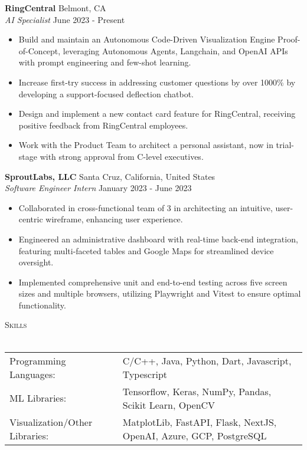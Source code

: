 \documentclass[a4paper]{article}
\newcommand{\lineunder} {
    \vspace*{-8pt} \\
    \hspace*{-18pt} \hrulefill \\
}
\newcommand{\header} [1] {
    {\hspace*{-18pt}\vspace*{6pt} \textsc{#1}}
    \vspace*{-6pt} \lineunder
}
\begin{document}
      \textbf{RingCentral} \hfill Belmont, CA\\
          \textit{AI Specialist} \hfill June 2023 - Present\\
          \vspace{-1mm}
\begin{itemize} \itemsep 1pt
  \item Build and maintain an Autonomous Code-Driven Visualization Engine Proof-of-Concept, leveraging Autonomous Agents, Langchain, and OpenAI APIs with prompt engineering and few-shot learning.
  \item Increase first-try success in addressing customer questions by over 1000\% by developing a support-focused deflection chatbot.
  \item Design and implement a new contact card feature for RingCentral, receiving positive feedback from RingCentral employees.
  \item Work with the Product Team to architect a personal assistant, now in trial-stage with strong approval from C-level executives.
\end{itemize}
      \textbf{SproutLabs, LLC} \hfill Santa Cruz, California, United States\\
          \textit{Software Engineer Intern} \hfill January 2023 - June 2023\\
          \vspace{-1mm}
\begin{itemize} \itemsep 1pt
  \item Collaborated in cross-functional team of 3 in architecting an intuitive, user-centric wireframe, enhancing user experience.
  \item Engineered an administrative dashboard with real-time back-end integration, featuring multi-faceted tables and Google Maps for streamlined device oversight.
  \item Implemented comprehensive unit and end-to-end testing across five screen sizes and multiple browsers, utilizing Playwright and Vitest to ensure optimal functionality.
\end{itemize}

\header{Skills}
\begin{tabular}{ l l }
Programming Languages: & C/C++, Java, Python, Dart, Javascript, Typescript \\
ML Libraries: & Tensorflow, Keras, NumPy, Pandas, Scikit Learn, OpenCV \\
Visualization/Other Libraries: & MatplotLib, FastAPI, Flask, NextJS, OpenAI, Azure, GCP, PostgreSQL \\
\end{tabular}
\vspace{2mm}
\end{document}
